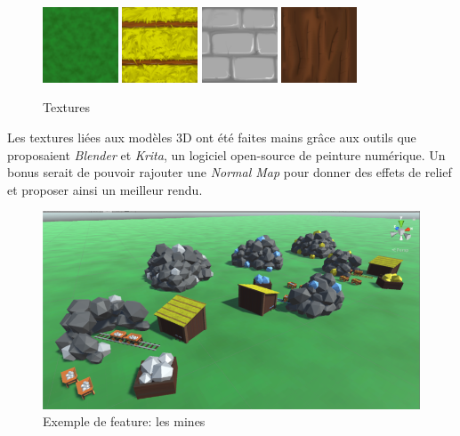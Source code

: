\documentclass[12pt]{report}
\begin{document}
\begin{figure}[H]
    \centering
    \includegraphics[width=0.2\textwidth]{Plain_Tex}
    \includegraphics[width=0.2\textwidth]{StrawRoof}
    \includegraphics[width=0.2\textwidth]{Wall}
    \includegraphics[width=0.2\textwidth]{Wood}
    \caption{Textures}
\end{figure}

Les textures liées aux modèles 3D ont été faites mains grâce aux outils que proposaient \textit{Blender} et \textit{Krita}, un logiciel open-source de peinture numérique. Un bonus serait de pouvoir rajouter une \textit{Normal Map} pour donner des effets de relief et proposer ainsi un meilleur rendu.

\begin{figure}[H]
    \centering
    \includegraphics[scale=0.8]{mines}
    \caption{Exemple de feature: les mines}
\end{figure}
\end{document}
